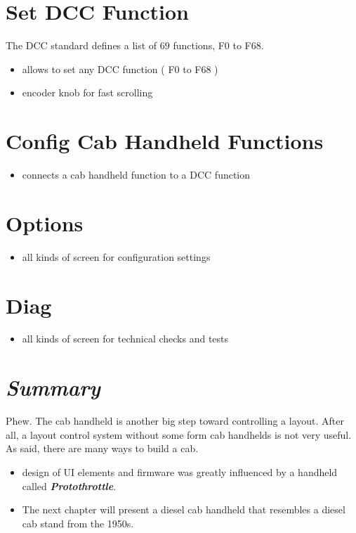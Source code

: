 \section{Set DCC Function}

The DCC standard defines a list of 69 functions, F0 to F68.
\begin{itemize}
\begin{itemize}
\item allows to set any DCC function ( F0 to F68 )
\item encoder knob for fast scrolling
\end{itemize}
\end{itemize}

\section{Config Cab Handheld Functions}
\begin{itemize}
\begin{itemize}
\item connects a cab handheld function to a DCC function
\end{itemize}
\end{itemize}

\section{Options}
\begin{itemize}
\begin{itemize}
\item all kinds of screen for configuration settings
\end{itemize}
\end{itemize}

\section{Diag}
\begin{itemize}
\begin{itemize}
\item all kinds of screen for technical checks and tests
\end{itemize}
\end{itemize}

\section{\textit{Summary}}

Phew. The cab handheld is another big step toward controlling a layout. After all, a layout control system without some form cab handhelds is not very useful. As said, there are many ways to build a cab.
\begin{itemize}
\begin{itemize}
\item design of UI elements and firmware was greatly influenced by a handheld called \textbf{\textit{Protothrottle}}.
\item The next chapter will present a diesel cab handheld that resembles a diesel cab stand from the 1950s.
\end{itemize}
\end{itemize}
